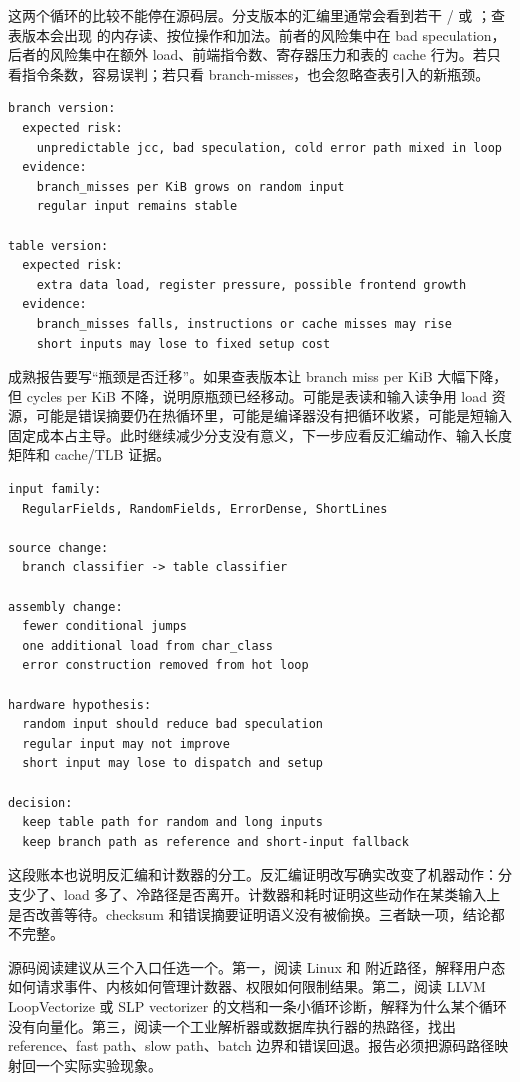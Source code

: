 这两个循环的比较不能停在源码层。分支版本的汇编里通常会看到若干 / 或 ；查表版本会出现  的内存读、按位操作和加法。前者的风险集中在 bad speculation，后者的风险集中在额外 load、前端指令数、寄存器压力和表的 cache 行为。若只看指令条数，容易误判；若只看 branch-misses，也会忽略查表引入的新瓶颈。

\begin{lstlisting}[numbers=none,caption={两种改写对应的硬件假设}]
branch version:
  expected risk:
    unpredictable jcc, bad speculation, cold error path mixed in loop
  evidence:
    branch_misses per KiB grows on random input
    regular input remains stable

table version:
  expected risk:
    extra data load, register pressure, possible frontend growth
  evidence:
    branch_misses falls, instructions or cache misses may rise
    short inputs may lose to fixed setup cost
\end{lstlisting}

成熟报告要写“瓶颈是否迁移”。如果查表版本让 branch miss per KiB 大幅下降，但 cycles per KiB 不降，说明原瓶颈已经移动。可能是表读和输入读争用 load 资源，可能是错误摘要仍在热循环里，可能是编译器没有把循环收紧，可能是短输入固定成本占主导。此时继续减少分支没有意义，下一步应看反汇编动作、输入长度矩阵和 cache/TLB 证据。

\begin{lstlisting}[numbers=none,caption={一次分支改写实验的解释模板}]
input family:
  RegularFields, RandomFields, ErrorDense, ShortLines

source change:
  branch classifier -> table classifier

assembly change:
  fewer conditional jumps
  one additional load from char_class
  error construction removed from hot loop

hardware hypothesis:
  random input should reduce bad speculation
  regular input may not improve
  short input may lose to dispatch and setup

decision:
  keep table path for random and long inputs
  keep branch path as reference and short-input fallback
\end{lstlisting}

这段账本也说明反汇编和计数器的分工。反汇编证明改写确实改变了机器动作：分支少了、load 多了、冷路径是否离开。计数器和耗时证明这些动作在某类输入上是否改善等待。checksum 和错误摘要证明语义没有被偷换。三者缺一项，结论都不完整。

\begin{sourcereadingbox}
源码阅读建议从三个入口任选一个。第一，阅读 Linux  和  附近路径，解释用户态  如何请求事件、内核如何管理计数器、权限如何限制结果。第二，阅读 LLVM LoopVectorize 或 SLP vectorizer 的文档和一条小循环诊断，解释为什么某个循环没有向量化。第三，阅读一个工业解析器或数据库执行器的热路径，找出 reference、fast path、slow path、batch 边界和错误回退。报告必须把源码路径映射回一个实际实验现象。
\end{sourcereadingbox}

